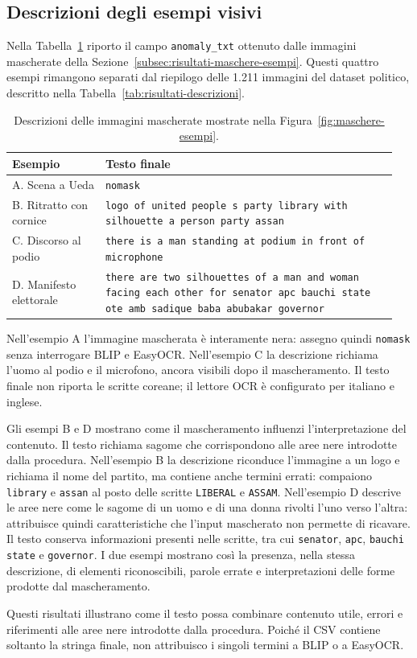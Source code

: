 \subsection{Descrizioni degli esempi visivi}
\label{subsec:risultati-descrizioni-esempi}

Nella Tabella~\ref{tab:descrizioni-esempi-commons} riporto il campo \texttt{anomaly\_txt} ottenuto dalle immagini mascherate della Sezione~\ref{subsec:risultati-maschere-esempi}. Questi quattro esempi rimangono separati dal riepilogo delle 1.211 immagini del dataset politico, descritto nella Tabella~\ref{tab:risultati-descrizioni}.

\begin{table}[htbp]
    \centering
    \small
    \caption{Descrizioni delle immagini mascherate mostrate nella Figura~\ref{fig:maschere-esempi}.}
    \label{tab:descrizioni-esempi-commons}
    \begin{tabular}{@{}>{\raggedright\arraybackslash}p{0.23\linewidth}>{\raggedright\arraybackslash}p{0.72\linewidth}@{}}
        \toprule
        Esempio & Testo finale \\
        \midrule
        A. Scena a Ueda & \texttt{nomask} \\
        \addlinespace
        B. Ritratto con cornice & \texttt{logo of united people s party library with silhouette a person party assan} \\
        \addlinespace
        C. Discorso al podio & \texttt{there is a man standing at podium in front of microphone} \\
        \addlinespace
        D. Manifesto elettorale & \texttt{there are two silhouettes of a man and woman facing each other for senator apc bauchi state ote amb sadique baba abubakar governor} \\
        \bottomrule
    \end{tabular}
\end{table}

Nell'esempio A l'immagine mascherata è interamente nera: assegno quindi \texttt{nomask} senza interrogare BLIP e EasyOCR. Nell'esempio C la descrizione richiama l'uomo al podio e il microfono, ancora visibili dopo il mascheramento. Il testo finale non riporta le scritte coreane; il lettore OCR è configurato per italiano e inglese.

Gli esempi B e D mostrano come il mascheramento influenzi l'interpretazione del contenuto. Il testo richiama sagome che corrispondono alle aree nere introdotte dalla procedura. Nell'esempio B la descrizione riconduce l'immagine a un logo e richiama il nome del partito, ma contiene anche termini errati: compaiono \texttt{library} e \texttt{assan} al posto delle scritte \texttt{LIBERAL} e \texttt{ASSAM}. Nell'esempio D descrive le aree nere come le sagome di un uomo e di una donna rivolti l'uno verso l'altra: attribuisce quindi caratteristiche che l'input mascherato non permette di ricavare. Il testo conserva informazioni presenti nelle scritte, tra cui \texttt{senator}, \texttt{apc}, \texttt{bauchi state} e \texttt{governor}. I due esempi mostrano così la presenza, nella stessa descrizione, di elementi riconoscibili, parole errate e interpretazioni delle forme prodotte dal mascheramento.

Questi risultati illustrano come il testo possa combinare contenuto utile, errori e riferimenti alle aree nere introdotte dalla procedura. Poiché il CSV contiene soltanto la stringa finale, non attribuisco i singoli termini a BLIP o a EasyOCR.
